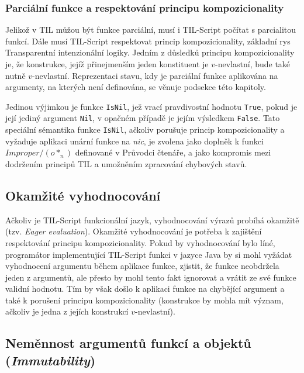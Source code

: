 \subsubsection{Parciální funkce a respektování principu kompozicionality}

Jelikož v TIL můžou být funkce parciální, musí i TIL-Script počítat s parcialitou funkcí. Dále musí
TIL-Script respektovat princip kompozicionality, základní rys Transparentní intenzionální logiky.
Jedním z důsledků principu kompozicionality je, že konstrukce, jejíž přinejmenším jeden konstituent
je $v$-nevlastní, bude také nutně $v$-nevlastní. Reprezentaci stavu, kdy je parciální funkce
aplikována na argumenty, na kterých není definována, se věnuje podsekce 
této kapitoly. 

Jedinou výjimkou je funkce \lstinline{IsNil}, jež vrací pravdivostní hodnotu \lstinline{True},
pokud je její jediný argument \lstinline{Nil}, v opačném případě je jejím výsledkem
\lstinline{False}. Tato speciální sémantika funkce \lstinline{IsNil}, ačkoliv porušuje princip
kompozicionality a vyžaduje aplikaci unární funkce na \textit{nic}, je zvolena jako doplněk
k funkci $Improper/(o*_n)$ definované v Průvodci čtenáře, a jako kompromis mezi dodržením
principů TIL a umožněním zpracování chybových stavů.


\subsection{Okamžité vyhodnocování}

Ačkoliv je TIL-Script funkcionální jazyk, vyhodnocování výrazů probíhá okamžitě
(tzv. \textit{Eager evaluation}). Okamžité vyhodnocování je potřeba k zajištění respektování
principu kompozicionality. Pokud by vyhodnocování bylo líné, programátor implementující TIL-Script
funkci v jazyce Java by si mohl vyžádat vyhodnocení argumentu během aplikace funkce, zjistit,
že funkce neobdržela jeden z argumentů, ale přesto by mohl tento fakt ignorovat a vrátit ze své
funkce validní hodnotu. Tím by však došlo k aplikaci funkce na chybějící argument a také k porušení
principu kompozicionality (konstrukce by mohla mít význam, ačkoliv je jedna z jejích konstrukcí
$v$-nevlastní).

\subsection{Neměnnost argumentů funkcí a objektů (\textit{Immutability})}

